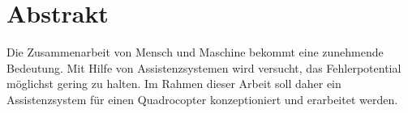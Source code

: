 \chapter*{Abstrakt} 
Die Zusammenarbeit von Mensch und Maschine bekommt eine zunehmende Bedeutung. Mit Hilfe von Assistenzsystemen wird versucht, das Fehlerpotential möglichst gering zu halten. \newline
Im Rahmen dieser Arbeit soll daher ein Assistenzsystem für einen Quadrocopter konzeptioniert und erarbeitet werden. 
